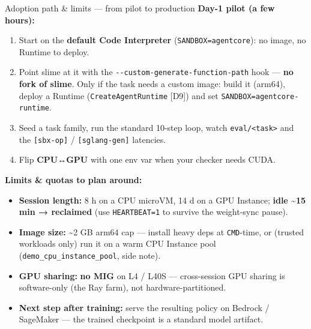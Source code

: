 \documentclass[
  10pt,
  ignorenonframetext,
  aspectratio=169,
  t]{beamer}
\providecommand{\tightlist}{%
  \setlength{\itemsep}{0pt}\setlength{\parskip}{0pt}}
\begin{document}
\begin{frame}{Adoption path \& limits --- from pilot to
production}
\protect\hypertarget{adoption-path-limits-from-pilot-to-production}{}
\textbf{Day-1 pilot (a few hours):}

\begin{enumerate}
\tightlist
\item
  Start on the \textbf{default Code Interpreter}
  (\texttt{SANDBOX=agentcore}): no image, no Runtime to deploy.
\item
  Point slime at it with the \texttt{-\/-custom-generate-function-path}
  hook --- \textbf{no fork of slime}. Only if the task needs a custom
  image: build it (arm64), deploy a Runtime (\texttt{CreateAgentRuntime}
  {[}D9{]}) and set \texttt{SANDBOX=agentcore-runtime}.
\item
  Seed a task family, run the standard 10-step loop, watch
  \texttt{eval/\textless{}task\textgreater{}} and the
  \texttt{{[}sbx-op{]}} / \texttt{{[}sglang-gen{]}} latencies.
\item
  Flip \textbf{CPU↔GPU} with one env var when your checker needs CUDA.
\end{enumerate}

\textbf{Limits \& quotas to plan around:}

\begin{itemize}
\tightlist
\item
  \textbf{Session length:} 8 h on a CPU microVM, 14 d on a GPU Instance;
  \textbf{idle \textasciitilde15 min → reclaimed} (use
  \texttt{HEARTBEAT=1} to survive the weight-sync pause).
\item
  \textbf{Image size:} \textasciitilde2 GB arm64 cap --- install heavy
  deps at \texttt{CMD}-time, or (trusted workloads only) run it on a
  warm CPU Instance pool (\texttt{demo\_cpu\_instance\_pool}, side
  note).
\item
  \textbf{GPU sharing:} \textbf{no MIG} on L4 / L40S --- cross-session
  GPU sharing is software-only (the Ray farm), not hardware-partitioned.
\item
  \textbf{Next step after training:} serve the resulting policy on
  Bedrock / SageMaker --- the trained checkpoint is a standard model
  artifact.
\end{itemize}
\end{frame}
\end{document}
